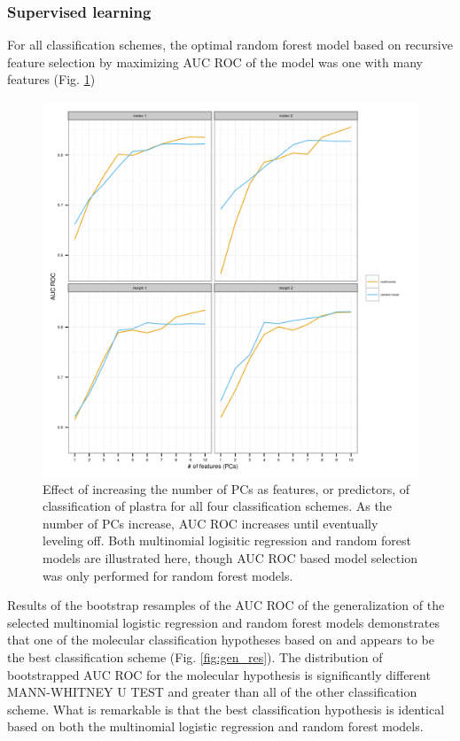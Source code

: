 \documentclass[12pt]{article}\usepackage{graphicx, color}
\begin{document}
\subsubsection{Supervised learning}
For all classification schemes, the optimal random forest model based on recursive feature selection by maximizing AUC ROC of the model was one with many features (Fig. \ref{fig:roc})

\begin{figure}[ht]
  \centering
  \includegraphics[width = \textwidth]{figure/roc_sel}
  \caption{Effect of increasing the number of PCs as features, or predictors, of classification of plastra for all four classification schemes. As the number of PCs increase, AUC ROC increases until eventually leveling off. Both multinomial logisitic regression and random forest models are illustrated here, though AUC ROC based model selection was only performed for random forest models.}
  \label{fig:roc}
\end{figure}


Results of the bootstrap resamples of the AUC ROC of the generalization of the selected multinomial logistic regression and random forest models demonstrates that one of the molecular classification hypotheses based on \citet{Spinks2005} and \citet{Spinks2010} appears to be the best classification scheme (Fig. \ref{fig:gen_res}). The distribution of bootstrapped AUC ROC for the molecular hypothesis is significantly different MANN-WHITNEY U TEST and greater than all of the other classification scheme. What is remarkable is that the best classification hypothesis is identical based on both the multinomial logistic regression and random forest models.
\end{document}

